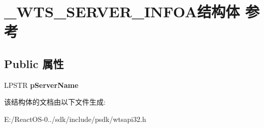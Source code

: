 \hypertarget{struct___w_t_s___s_e_r_v_e_r___i_n_f_o_a}{}\section{\+\_\+\+W\+T\+S\+\_\+\+S\+E\+R\+V\+E\+R\+\_\+\+I\+N\+F\+O\+A结构体 参考}
\label{struct___w_t_s___s_e_r_v_e_r___i_n_f_o_a}
\subsection*{Public 属性}
\begin{DoxyCompactItemize}
\item 
\mbox{\label{struct___w_t_s___s_e_r_v_e_r___i_n_f_o_a_abd91e1b15e3bdd46a1cda4cac228d8e4}} 
L\+P\+S\+TR {\bfseries p\+Server\+Name}
\end{DoxyCompactItemize}


该结构体的文档由以下文件生成\+:\begin{DoxyCompactItemize}
\item 
E\+:/\+React\+O\+S-\/0../sdk/include/psdk/wtsapi32.\+h\end{DoxyCompactItemize}
